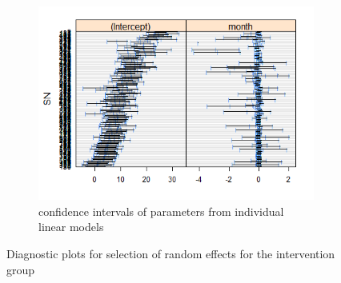 \begin{figure}[t]
\begin{subfigure}{.33\textwidth}
  \includegraphics[width=1\linewidth]{../../plots/interval_treatment.png}
  \caption{confidence intervals of parameters from individual linear models}
  \label{fig:4c}
\end{subfigure}
\caption{Diagnostic plots for selection of random effects for the intervention group}
\label{fig:diagnostic.treatment}
\end{figure}

